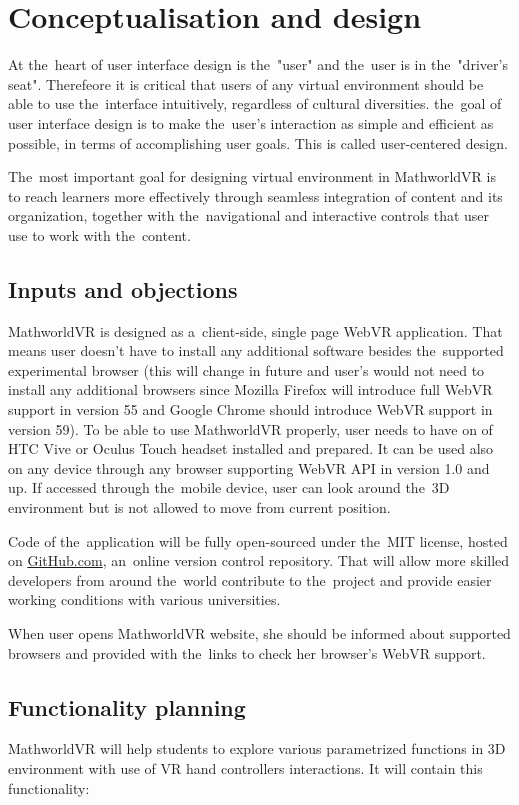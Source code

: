 \section{Conceptualisation and design}
At the~heart of user interface design is the~"user" and the~user is in the~"driver's seat". Therefeore it is critical that users of any virtual environment should be able to use the~interface intuitively, regardless of cultural diversities. the~goal of user interface design is to make the~user's interaction as simple and efficient as possible, in terms of accomplishing user goals. This is called user-centered design. \cite{badrul}

The~most important goal for designing virtual environment in MathworldVR is to reach learners more effectively through seamless integration of content and its organization, together with the~navigational and interactive controls that user use to work with the~content.


\subsection{Inputs and objections}
MathworldVR is designed as a~client-side, single page WebVR application. That means user doesn't have to install any additional software besides the~supported experimental browser (this will change in future and user's would not need to install any additional browsers since Mozilla Firefox will introduce full WebVR support in version 55 and Google Chrome should introduce WebVR support in version 59). To be able to use MathworldVR properly, user needs to have on of HTC Vive or Oculus Touch headset installed and prepared. It can be used also on any device through any browser supporting WebVR API in version 1.0 and up. If accessed through the~mobile device, user can look around the~3D environment but is not allowed to move from current position.

Code of the~application will be fully open-sourced under the~MIT license, hosted on \url{GitHub.com}, an~online version control repository. That will allow more skilled developers from around the~world contribute to the~project and provide easier working conditions with various universities.

When user opens MathworldVR website, she should be informed about supported browsers and provided with the~links to check her browser's WebVR support.

\subsection{Functionality planning}
MathworldVR will help students to explore various parametrized functions in 3D environment with use of VR hand controllers interactions. It will contain this functionality:

